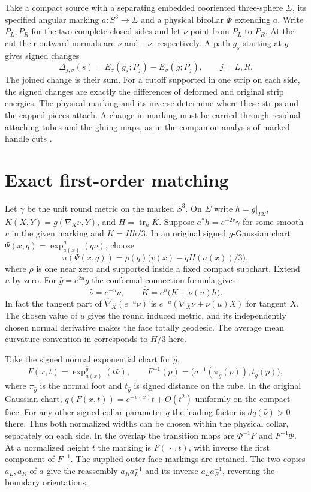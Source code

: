 \documentclass[11pt,letterpaper]{article}
\numberwithin{equation}{section}
\DeclareMathOperator{\tr}{tr}
\newcommand{\rd}{\gamma}
\begin{document}
Take a compact source with a separating embedded cooriented
three-sphere \(\Sigma\), its specified angular marking
\(a:S^3\to\Sigma\) and a physical bicollar \(\Phi\) extending \(a\).
Write \(P_L,P_R\) for the two complete closed sides and let \(\nu\)
point from \(P_L\) to \(P_R\). At the cut their outward normals
are \(\nu\) and \(-\nu\), respectively. A path \(g_s\) starting
at \(g\) gives signed changes
\[
 \Delta_{j,\sigma}(s)=E_\sigma(g_s;P_j)-E_\sigma(g;P_j),
 \qquad j=L,R .
\]
The joined change is their sum. For a cutoff supported in one
strip on each side, the signed changes are exactly the differences
of deformed and original strip energies. The physical marking and
its inverse determine where these strips and the capped pieces
attach. A change in marking must be carried through residual
attaching tubes and the gluing maps, as in the companion analysis
of marked handle cuts \cite{Baker2026HandleCuts,Baker2026CollarProgram}.



\section{Exact first-order matching}\label{sec:exact}

Let \(\rd\) be the unit round metric on the marked \(S^3\). On
\(\Sigma\) write \(h=g|_{T\Sigma}\),
\(K(X,Y)=g(\nabla_X\nu,Y)\), and \(H=\tr_h K\).
Suppose \(a^*h=e^{-2v}\rd\) for some smooth \(v\) in the given
marking and \(K=Hh/3\). In an original signed \(g\)-Gaussian chart
\(\Psi(x,q)=\exp^g_{a(x)}(q\nu)\), choose
\[
 u(\Psi(x,q))=\rho(q)\bigl(v(x)-qH(a(x))/3\bigr),
\]
where \(\rho\) is one near zero and supported inside a fixed compact
subchart. Extend \(u\) by zero. For \(\widehat g=e^{2u}g\) the
conformal connection formula gives
\[
 \widehat\nu=e^{-u}\nu,\qquad
 \widehat K=e^u\bigl(K+\nu(u)h\bigr).
\]
In fact the tangent part of \(\widehat\nabla_X(e^{-u}\nu)\) is
\(e^{-u}(\nabla_X\nu+\nu(u)X)\) for tangent \(X\). The chosen value
of \(u\) gives the round induced metric, and its independently chosen
normal derivative makes the face totally geodesic. The average mean
curvature convention in \cite[\S6.1, Proposition 6.1 and Remark 6.5]{CurryGover2015Introduction}
corresponds to \(H/3\) here.

Take the signed normal exponential chart for \(\widehat g\),
\[
 F(x,t)=\exp^{\widehat g}_{a(x)}(t\widehat\nu),\qquad
 F^{-1}(p)=\bigl(a^{-1}(\pi_{\widehat g}(p)),t_{\widehat g}(p)\bigr),
\]
where \(\pi_{\widehat g}\) is the normal foot and \(t_{\widehat g}\)
is signed distance on the tube. In the original Gaussian chart,
\(q(F(x,t))=e^{-v(x)}t+O(t^2)\) uniformly on the compact face.
For any other signed collar parameter \(q\) the leading factor is
\(dq(\widehat\nu)>0\) there. Thus both normalized widths can be
chosen within the physical collar, separately on each side.
In the overlap the transition maps are \(\Phi^{-1}F\) and
\(F^{-1}\Phi\). At a normalized height \(t\) the marking is
\(F(\,\cdot\,,t)\), with inverse the first component of \(F^{-1}\).
The supplied outer-face markings are retained. The two copies
\(a_L,a_R\) of \(a\) give the reassembly \(a_Ra_L^{-1}\)
and its inverse \(a_La_R^{-1}\), reversing the boundary
orientations.
\end{document}
